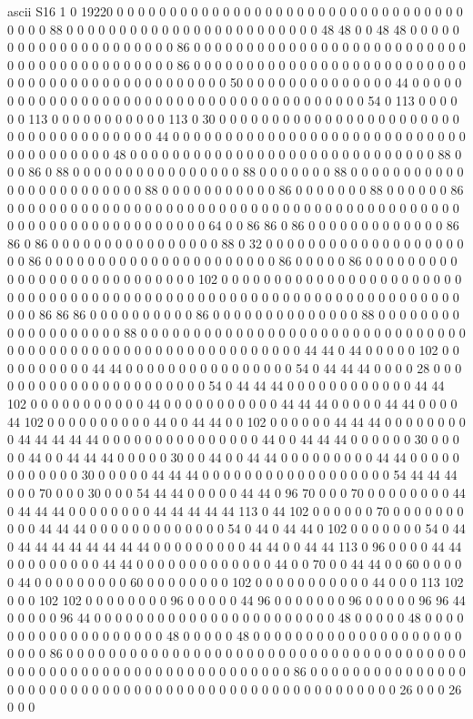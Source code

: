 ascii
S16
1
0 19220 0 0 0 0 0 0 0 0 0 0 0 0 0 0 0 0 0 0 0 0 0 0 0 0 0 0 0 0 0 0 0 0 0 0 0 0 0 88 0 0 0 0 0 0 0 0 0 0 0 0 0 0 0 0 0 0 0 0 0 0 0 0 48 48 0 0 48 48 0 0 0 0 0 0 0 0 0 0 0 0 0 0 0 0 0 0 0 0 0 86 0 0 0 0 0 0 0 0 0 0 0 0 0 0 0 0 0 0 0 0 0 0 0 0 0 0 0 0 0 0 0 0 0 0 0 0 0 0 0 0 0 0 86 0 0 0 0 0 0 0 0 0 0 0 0 0 0 0 0 0 0 0 0 0 0 0 0 0 0 0 0 0 0 0 0 0 0 0 0 0 0 0 0 0 0 0 0 0 0 0 50 0 0 0 0 0 0 0 0 0 0 0 0 0 0 44 0 0 0 0 0 0 0 0 0 0 0 0 0 0 0 0 0 0 0 0 0 0 0 0 0 0 0 0 0 0 0 0 0 0 0 0 0 0 0 54 0 113 0 0 0 0 0 0 113 0 0 0 0 0 0 0 0 0 0 0 113 0 30 0 0 0 0 0 0 0 0 0 0 0 0 0 0 0 0 0 0 0 0 0 0 0 0 0 0 0 0 0 0 0 0 0 0 0 0 0 44 0 0 0 0 0 0 0 0 0 0 0 0 0 0 0 0 0 0 0 0 0 0 0 0 0 0 0 0 0 0 0 0 0 0 0 0 0 0 48 0 0 0 0 0 0 0 0 0 0 0 0 0 0 0 0 0 0 0 0 0 0 0 0 0 0 0 0 0 88 0 0 0 86 0 88 0 0 0 0 0 0 0 0 0 0 0 0 0 0 0 0 88 0 0 0 0 0 0 0 88 0 0 0 0 0 0 0 0 0 0 0 0 0 0 0 0 0 0 0 0 0 0 0 0 88 0 0 0 0 0 0 0 0 0 0 0 86 0 0 0 0 0 0 0 88 0 0 0 0 0 0 86 0 0 0 0 0 0 0 0 0 0 0 0 0 0 0 0 0 0 0 0 0 0 0 0 0 0 0 0 0 0 0 0 0 0 0 0 0 0 0 0 0 0 0 0 0 0 0 0 0 0 0 0 0 0 0 0 0 0 0 0 0 0 64 0 0 86 86 0 86 0 0 0 0 0 0 0 0 0 0 0 0 0 86 86 0 86 0 0 0 0 0 0 0 0 0 0 0 0 0 0 0 0 88 0 32 0 0 0 0 0 0 0 0 0 0 0 0 0 0 0 0 0 0 0 0 0 86 0 0 0 0 0 0 0 0 0 0 0 0 0 0 0 0 0 0 0 0 0 0 86 0 0 0 0 0 86 0 0 0 0 0 0 0 0 0 0 0 0 0 0 0 0 0 0 0 0 0 0 0 0 0 0 0 102 0 0 0 0 0 0 0 0 0 0 0 0 0 0 0 0 0 0 0 0 0 0 0 0 0 0 0 0 0 0 0 0 0 0 0 0 0 0 0 0 0 0 0 0 0 0 0 0 0 0 0 0 0 0 0 0 0 0 0 0 0 0 0 0 0 0 0 0 0 86 86 86 0 0 0 0 0 0 0 0 0 0 86 0 0 0 0 0 0 0 0 0 0 0 0 0 0 88 0 0 0 0 0 0 0 0 0 0 0 0 0 0 0 0 0 0 0 88 0 0 0 0 0 0 0 0 0 0 0 0 0 0 0 0 0 0 0 0 0 0 0 0 0 0 0 0 0 0 0 0 0 0 0 0 0 0 0 0 0 0 0 0 0 0 0 0 0 0 0 0 0 0 0 0 0 0 0 44 44 0 44 0 0 0 0 0 102 0 0 0 0 0 0 0 0 0 0 44 44 0 0 0 0 0 0 0 0 0 0 0 0 0 0 0 0 54 0 44 44 44 0 0 0 0 28 0 0 0 0 0 0 0 0 0 0 0 0 0 0 0 0 0 0 0 0 0 0 54 0 44 44 44 0 0 0 0 0 0 0 0 0 0 0 0 44 44 102 0 0 0 0 0 0 0 0 0 0 0 44 0 0 0 0 0 0 0 0 0 0 0 44 44 44 0 0 0 0 0 44 44 0 0 0 0 44 102 0 0 0 0 0 0 0 0 0 0 44 0 0 44 44 0 0 102 0 0 0 0 0 0 44 44 44 0 0 0 0 0 0 0 0 0 44 44 44 44 44 0 0 0 0 0 0 0 0 0 0 0 0 0 0 0 44 0 0 44 44 44 0 0 0 0 0 0 30 0 0 0 0 0 44 0 0 44 44 44 0 0 0 0 0 30 0 0 44 0 0 44 44 0 0 0 0 0 0 0 0 0 44 44 0 0 0 0 0 0 0 0 0 0 0 0 30 0 0 0 0 0 44 44 44 0 0 0 0 0 0 0 0 0 0 0 0 0 0 0 0 0 0 54 44 44 44 0 0 0 70 0 0 0 30 0 0 0 54 44 44 0 0 0 0 0 44 44 0 96 70 0 0 0 70 0 0 0 0 0 0 0 0 44 0 44 44 44 0 0 0 0 0 0 0 0 44 44 44 44 44 113 0 44 102 0 0 0 0 0 0 70 0 0 0 0 0 0 0 0 0 0 44 44 44 0 0 0 0 0 0 0 0 0 0 0 0 0 54 0 44 0 44 44 0 102 0 0 0 0 0 0 0 54 0 44 0 44 44 44 44 44 44 44 44 0 0 0 0 0 0 0 0 0 44 44 0 0 44 44 113 0 96 0 0 0 0 44 44 0 0 0 0 0 0 0 0 0 44 44 0 0 0 0 0 0 0 0 0 0 0 0 0 44 0 0 70 0 0 44 44 0 0 60 0 0 0 0 0 44 0 0 0 0 0 0 0 0 0 60 0 0 0 0 0 0 0 0 102 0 0 0 0 0 0 0 0 0 0 0 44 0 0 0 113 102 0 0 0 102 102 0 0 0 0 0 0 0 0 96 0 0 0 0 0 44 96 0 0 0 0 0 0 0 96 0 0 0 0 0 96 96 44 0 0 0 0 0 96 44 0 0 0 0 0 0 0 0 0 0 0 0 0 0 0 0 0 0 0 0 0 0 0 48 0 0 0 0 0 48 0 0 0 0 0 0 0 0 0 0 0 0 0 0 0 0 0 0 0 48 0 0 0 0 0 48 0 0 0 0 0 0 0 0 0 0 0 0 0 0 0 0 0 0 0 0 0 0 0 0 86 0 0 0 0 0 0 0 0 0 0 0 0 0 0 0 0 0 0 0 0 0 0 0 0 0 0 0 0 0 0 0 0 0 0 0 0 0 0 0 0 0 0 0 0 0 0 0 0 0 0 0 0 0 0 0 0 0 0 0 0 0 0 0 0 0 86 0 0 0 0 0 0 0 0 0 0 0 0 0 0 0 0 0 0 0 0 0 0 0 0 0 0 0 0 0 0 0 0 0 0 0 0 0 0 0 0 0 0 0 0 0 0 0 0 0 0 0 0 26 0 0 0 26 0 0 0 